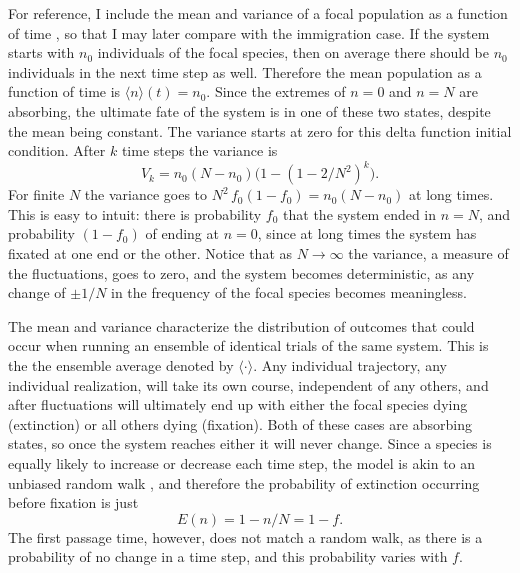 For reference, I include the mean and variance of a focal population as a function of time \cite{Moran1962,Kimura1964,McKane2003}, so that I may later compare with the immigration case. 
If the system starts with $n_0$ individuals of the focal species, then on average there should be $n_0$ individuals in the next time step as well.
Therefore the mean population as a function of time is $\langle n\rangle(t) = n_0$. 
Since the extremes of $n=0$ and $n=N$ are absorbing, the ultimate fate of the system is in one of these two states, despite the mean being constant. 
The variance starts at zero for this delta function initial condition. 
After $k$ time steps the variance is
\begin{equation*}
V_k = n_0(N-n_0) \big(1-(1-2/N^2)^k\big).
\end{equation*}
For finite $N$ the variance goes to $N^2 \, f_0(1-f_0)=n_0(N-n_0)$ at long times. 
This is easy to intuit: there is probability $f_0$ that the system ended in $n=N$, and probability $(1-f_0)$ of ending at $n=0$, since at long times the system has fixated at one end or the other. 
Notice that as $N\rightarrow\infty$ the variance, a measure of the fluctuations, goes to zero, and the system becomes deterministic, as any change of $\pm 1/N$ in the frequency of the focal species becomes meaningless. 

The mean and variance characterize the distribution of outcomes that could occur when running an ensemble of identical trials of the same system. 
This is the the ensemble average denoted by $\langle \cdot \rangle$. 
Any individual trajectory, any individual realization, will take its own course, independent of any others, and after fluctuations will ultimately end up with either the focal species dying (extinction) or all others dying (fixation). 
Both of these cases are absorbing states, so once the system reaches either it will never change.
Since a species is equally likely to increase or decrease each time step, the model is akin to an unbiased random walk \cite{Gardiner2004}, and therefore the probability of extinction occurring before fixation is just
\begin{equation}
E(n) = 1-n/N = 1-f.
\end{equation}
The first passage time, however, does not match a random walk, as there is a probability of no change in a time step, and this probability varies with $f$.

